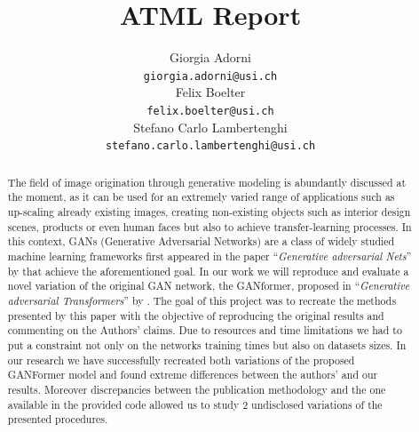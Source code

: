 \documentclass{article}
\title{ATML Report}
\author{%
		Giorgia Adorni \\
		\texttt{giorgia.adorni@usi.ch} \\
		\And
		Felix Boelter\\
		\texttt{felix.boelter@usi.ch}\\
		\And
		Stefano Carlo Lambertenghi\\
		\texttt{stefano.carlo.lambertenghi@usi.ch}\\
}
\begin{document}
	
	\maketitle
	\begin{abstract}
		The field of image origination through generative modeling is abundantly discussed at
		the moment, as it can be used for an extremely varied range of applications such as 
		up-scaling already existing images, creating non-existing objects such as interior 
		design scenes, products or even human faces but also to achieve transfer-learning 
		processes.
		In this context, GANs (Generative Adversarial Networks) are a class of widely studied 
		machine learning frameworks first appeared in the paper 
		``\emph{Generative adversarial Nets}'' by \citet{goodfellow2014generative} that achieve
		the aforementioned goal.
		In our work we will reproduce and evaluate a novel variation of the original GAN 
		network, the GANformer, proposed in  ``\emph{Generative adversarial Transformers}'' by 
		\citet{hudson2021generative}.
		The goal of this project was to recreate the methods presented by this paper with the objective of reproducing the original results and commenting on the Authors' claims.
		Due to resources and time limitations we had to put a constraint not only on the networks training times but also on datasets sizes.
		In our research we have successfully recreated both variations of the proposed GANFormer model and found extreme differences between the authors' and our results.
		Moreover discrepancies between the publication methodology and the one available in the provided code allowed us to study 2 undisclosed variations of the presented procedures.
	\end{abstract}

	
\end{document}
